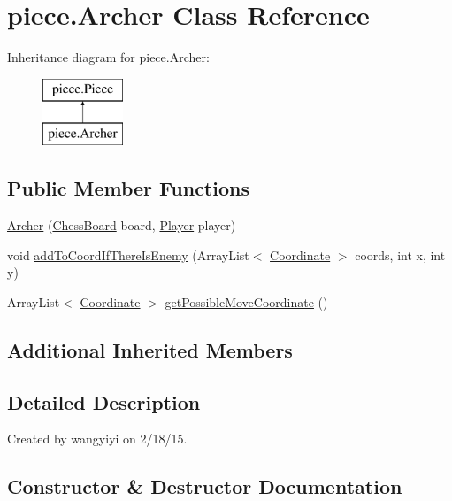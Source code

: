 \hypertarget{classpiece_1_1_archer}{}\section{piece.\+Archer Class Reference}
\label{classpiece_1_1_archer}
Inheritance diagram for piece.\+Archer\+:\begin{figure}[H]
\begin{center}
\leavevmode
\includegraphics[height=2.000000cm]{classpiece_1_1_archer}
\end{center}
\end{figure}
\subsection*{Public Member Functions}
\begin{DoxyCompactItemize}
\item 
\hyperlink{classpiece_1_1_archer_a0a99d10d9c827a180e8743ec10489344}{Archer} (\hyperlink{classchess_1_1_chess_board}{Chess\+Board} board, \hyperlink{enumchess_1_1_player}{Player} player)
\item 
void \hyperlink{classpiece_1_1_archer_ae536059b2403dfe1ca315b8166d90c45}{add\+To\+Coord\+If\+There\+Is\+Enemy} (Array\+List$<$ \hyperlink{classpiece_1_1_coordinate}{Coordinate} $>$ coords, int x, int y)
\item 
Array\+List$<$ \hyperlink{classpiece_1_1_coordinate}{Coordinate} $>$ \hyperlink{classpiece_1_1_archer_afaddadc53c41508da32f6c14e5e57317}{get\+Possible\+Move\+Coordinate} ()
\end{DoxyCompactItemize}
\subsection*{Additional Inherited Members}


\subsection{Detailed Description}
Created by wangyiyi on 2/18/15. 

\subsection{Constructor \& Destructor Documentation}
\hypertarget{classpiece_1_1_archer_a0a99d10d9c827a180e8743ec10489344}{}

